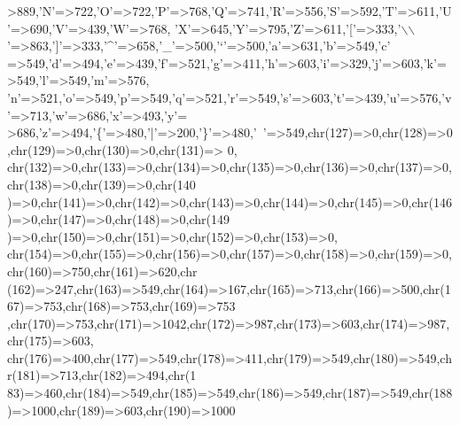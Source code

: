 \begin{DoxyCode}
{      >889,\textcolor{charliteral}{'N'}=>722,\textcolor{charliteral}{'O'}=>722,\textcolor{charliteral}{'P'}=>768,\textcolor{charliteral}{'Q'}=>741,\textcolor{charliteral}{'R'}=>556,\textcolor{charliteral}{'S'}=>592,\textcolor{charliteral}{'T'}=>611,\textcolor{charliteral}{'U'}=>690,\textcolor{charliteral}{'V'}=>439,\textcolor{charliteral}{'W'}=>768,
    \textcolor{charliteral}{'X'}=>645,\textcolor{charliteral}{'Y'}=>795,\textcolor{charliteral}{'Z'}=>611,\textcolor{charliteral}{'['}=>333,\textcolor{charliteral}{'\(\backslash\)\(\backslash\)'}=>863,\textcolor{charliteral}{']'}=>333,\textcolor{charliteral}{'^'}=>658,\textcolor{charliteral}{'\_'}=>500,\textcolor{charliteral}{'`'}=>500,\textcolor{charliteral}{'a'}=>631,\textcolor{charliteral}{'b'}=>549,\textcolor{charliteral}{'c'}
      =>549,\textcolor{charliteral}{'d'}=>494,\textcolor{charliteral}{'e'}=>439,\textcolor{charliteral}{'f'}=>521,\textcolor{charliteral}{'g'}=>411,\textcolor{charliteral}{'h'}=>603,\textcolor{charliteral}{'i'}=>329,\textcolor{charliteral}{'j'}=>603,\textcolor{charliteral}{'k'}=>549,\textcolor{charliteral}{'l'}=>549,\textcolor{charliteral}{'m'}=>576,
    \textcolor{charliteral}{'n'}=>521,\textcolor{charliteral}{'o'}=>549,\textcolor{charliteral}{'p'}=>549,\textcolor{charliteral}{'q'}=>521,\textcolor{charliteral}{'r'}=>549,\textcolor{charliteral}{'s'}=>603,\textcolor{charliteral}{'t'}=>439,\textcolor{charliteral}{'u'}=>576,\textcolor{charliteral}{'v'}=>713,\textcolor{charliteral}{'w'}=>686,\textcolor{charliteral}{'x'}=>493,\textcolor{charliteral}{'y'}=
      >686,\textcolor{charliteral}{'z'}=>494,\textcolor{charliteral}{'\{'}=>480,\textcolor{charliteral}{'|'}=>200,\textcolor{charliteral}{'\}'}=>480,\textcolor{charliteral}{'~'}=>549,chr(127)=>0,chr(128)=>0,chr(129)=>0,chr(130)=>0,chr(131)=>
      0,
    chr(132)=>0,chr(133)=>0,chr(134)=>0,chr(135)=>0,chr(136)=>0,chr(137)=>0,chr(138)=>0,chr(139)=>0,chr(140
      )=>0,chr(141)=>0,chr(142)=>0,chr(143)=>0,chr(144)=>0,chr(145)=>0,chr(146)=>0,chr(147)=>0,chr(148)=>0,chr(149
      )=>0,chr(150)=>0,chr(151)=>0,chr(152)=>0,chr(153)=>0,
    chr(154)=>0,chr(155)=>0,chr(156)=>0,chr(157)=>0,chr(158)=>0,chr(159)=>0,chr(160)=>750,chr(161)=>620,chr
      (162)=>247,chr(163)=>549,chr(164)=>167,chr(165)=>713,chr(166)=>500,chr(167)=>753,chr(168)=>753,chr(169)=>753
      ,chr(170)=>753,chr(171)=>1042,chr(172)=>987,chr(173)=>603,chr(174)=>987,chr(175)=>603,
    chr(176)=>400,chr(177)=>549,chr(178)=>411,chr(179)=>549,chr(180)=>549,chr(181)=>713,chr(182)=>494,chr(1
      83)=>460,chr(184)=>549,chr(185)=>549,chr(186)=>549,chr(187)=>549,chr(188)=>1000,chr(189)=>603,chr(190)=>1000
}
\end{DoxyCode}
